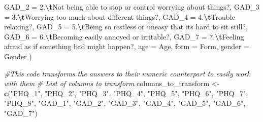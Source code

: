 \documentclass[
]{article}
\newenvironment{Shaded}{\begin{snugshade}}{\end{snugshade}}
\newcommand{\AttributeTok}[1]{\textcolor[rgb]{0.13,0.29,0.53}{#1}}
\newcommand{\CommentTok}[1]{\textcolor[rgb]{0.56,0.35,0.01}{\textit{#1}}}
\newcommand{\FunctionTok}[1]{\textcolor[rgb]{0.13,0.29,0.53}{\textbf{#1}}}
\newcommand{\NormalTok}[1]{#1}
\newcommand{\OtherTok}[1]{\textcolor[rgb]{0.56,0.35,0.01}{#1}}
\newcommand{\SpecialCharTok}[1]{\textcolor[rgb]{0.81,0.36,0.00}{\textbf{#1}}}
\newcommand{\StringTok}[1]{\textcolor[rgb]{0.31,0.60,0.02}{#1}}
\begin{document}
\begin{Shaded}
\begin{Highlighting}[]
    \AttributeTok{GAD\_2 =} \StringTok{\textasciigrave{}}\AttributeTok{2.}\SpecialCharTok{\textbackslash{}t}\AttributeTok{Not being able to stop or control worrying about things?}\StringTok{\textasciigrave{}}\NormalTok{,}
    \AttributeTok{GAD\_3 =} \StringTok{\textasciigrave{}}\AttributeTok{3.}\SpecialCharTok{\textbackslash{}t}\AttributeTok{Worrying too much about different things?}\StringTok{\textasciigrave{}}\NormalTok{,}
    \AttributeTok{GAD\_4 =} \StringTok{\textasciigrave{}}\AttributeTok{4.}\SpecialCharTok{\textbackslash{}t}\AttributeTok{Trouble relaxing?}\StringTok{\textasciigrave{}}\NormalTok{,}
    \AttributeTok{GAD\_5 =} \StringTok{\textasciigrave{}}\AttributeTok{5.}\SpecialCharTok{\textbackslash{}t}\AttributeTok{Being so restless or uneasy that it\textquotesingle{}s hard to sit still?}\StringTok{\textasciigrave{}}\NormalTok{,}
    \AttributeTok{GAD\_6 =} \StringTok{\textasciigrave{}}\AttributeTok{6.}\SpecialCharTok{\textbackslash{}t}\AttributeTok{Becoming easily annoyed or irritable?}\StringTok{\textasciigrave{}}\NormalTok{,}
    \AttributeTok{GAD\_7  =} \StringTok{\textasciigrave{}}\AttributeTok{7.}\SpecialCharTok{\textbackslash{}t}\AttributeTok{Feeling afraid as if something bad might happen?}\StringTok{\textasciigrave{}}\NormalTok{,}
    \AttributeTok{age =}\NormalTok{ Age,}
    \AttributeTok{form =}\NormalTok{ Form,}
    \AttributeTok{gender =}\NormalTok{ Gender}
\NormalTok{  )}


\CommentTok{\#This code transforms the answers to their numeric counterpart to easily work with them}
\CommentTok{\# List of columns to transform}
\NormalTok{columns\_to\_transform }\OtherTok{\textless{}{-}} \FunctionTok{c}\NormalTok{(}\StringTok{"PHQ\_1"}\NormalTok{, }\StringTok{"PHQ\_2"}\NormalTok{,}
                          \StringTok{"PHQ\_3"}\NormalTok{, }\StringTok{"PHQ\_4"}\NormalTok{,}
                          \StringTok{"PHQ\_5"}\NormalTok{, }\StringTok{"PHQ\_6"}\NormalTok{, }\StringTok{"PHQ\_7"}\NormalTok{,}
                          \StringTok{"PHQ\_8"}\NormalTok{, }\StringTok{"GAD\_1"}\NormalTok{, }\StringTok{"GAD\_2"}\NormalTok{,}
                          \StringTok{"GAD\_3"}\NormalTok{, }\StringTok{"GAD\_4"}\NormalTok{, }\StringTok{"GAD\_5"}\NormalTok{,}
                          \StringTok{"GAD\_6"}\NormalTok{, }\StringTok{"GAD\_7"}\NormalTok{)}


\end{Highlighting}
\end{Shaded}
\end{document}
